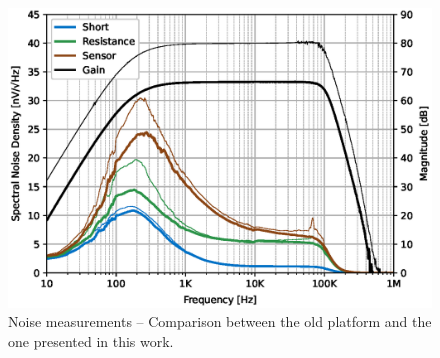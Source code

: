 \begin{figure}[!ht]
    \centering
    \includegraphics[width=.65\textwidth]{images/chapter_4/discussion_results/noise.eps}
    \caption{Noise measurements -- Comparison between the old platform and the one presented in this work.}
    \label{figure:noise}
\end{figure}

